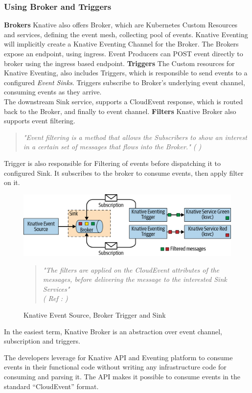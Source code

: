 \documentclass{article}
\begin{document}
\begin{flushleft}
\subsubsection{Using Broker and Triggers}
\textbf{Brokers} \break
Knative also offers Broker, which are Kubernetes Custom Resources and services, defining the event mesh, collecting pool of events. Knative Eventing will implicitly create a Knative Eventing Channel for the Broker. The Brokers expose an endpoint, using ingress. Event Producers can POST event directly to broker using the ingress based endpoint.
\hfil \break
\textbf{Triggers} \break
The Custom resources for Knative Eventing, also includes Triggers, which is responsible to send events to a configured \textit{Event Sinks}. Triggers subscribe to Broker's underlying event channel, consuming events as they arrive.\\
The downstream Sink service, supports a CloudEvent response, which is routed back to the Broker, and finally to event channel.
\hfill \break
\textbf{Filters} \break
Knative Broker also supports event filtering.
\begin{quote}
    \textit{
    "Event filtering is a method that allows the Subscribers to show an interest in a certain set of messages that flows into the Broker."
    ( \cite{Sutter_Sampath_2020} )
    }
\end{quote}
Trigger is also responsible for Filtering of events before dispatching it to configured Sink. It subscribes to the broker to consume events, then apply filter on it.


\begin{figure}[h]
    \centering
    \includegraphics[width=1.00\linewidth]{images/knative-event-broker.png}
    \caption{Knative Event Source, Broker Trigger and Sink}
    \begin{quote}
    \textit{"The filters are applied on the CloudEvent attributes of the messages, before delivering the message to the interested Sink Services" \\ (  Ref : \cite{Sutter_Sampath_2020} ) }
    \end{quote}
\end{figure}
In the easiest term, Knative Broker is an abstraction over event channel, subscription and triggers.

\par
The developers leverage for Knative API and Eventing platform to consume events in their functional code without writing any infrastructure code for consuming and parsing it. The API makes it possible to consume events in the standard “CloudEvent” format.
\end{flushleft}
\pagebreak
\end{document}
